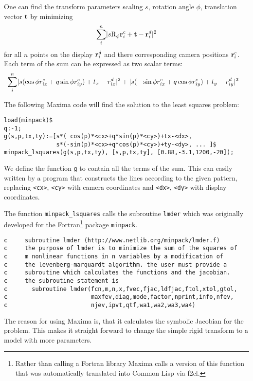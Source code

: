 One can find the transform parameters scaling $s$, rotation angle
$\phi$, translation vector $\mathbf{t}$ by minimizing
\begin{align}
  \sum_i^n \mathopen| s \textrm{R}_\phi \mathbf{r}^c_i+\mathbf{t} -\mathbf{r}^d_i \mathclose|^2 \label{eq:rigid-sum}
\end{align}
for all $n$ points on the display $\mathbf{r}^d_i$ and there corresponding
camera positions $\mathbf{r}^c_i$.  Each term of the sum can be expressed as
two scalar terms:
\begin{align*}
  \sum_i^n&
  \mathopen| s(\cos\phi r^c_{ix}+q\sin\phi r^c_{iy})+t_x-r^d_{ix} \mathclose|^2
  +
  \mathopen| s(-\sin\phi r^c_{ix}+q\cos\phi r^c_{iy})+t_y-r^d_{iy} \mathclose|^2
\end{align*}

The following Maxima code will find the solution to the least squares
problem:
\begin{verbatim}
load(minpack)$
q:-1;
g(s,p,tx,ty):=[s*( cos(p)*<cx>+q*sin(p)*<cy>)+tx-<dx>,
               s*(-sin(p)*<cx>+q*cos(p)*<cy>)+ty-<dy>, ... ]$
minpack_lsquares(g(s,p,tx,ty), [s,p,tx,ty], [0.88,-3.1,1200,-20]);
\end{verbatim}
We define the function \verb!g! to contain all the terms of the sum.
This can easily written by a program that constructs the lines
according to the given pattern, replacing \verb!<cx>!, \verb!<cy>!
with camera coordinates and \verb!<dx>!, \verb!<dy>! with display
coordinates.

The function \verb!minpack_lsquares! calls the subroutine \verb!lmder!
which was originally developed for the Fortran\footnote{Rather than
  calling a Fortran library Maxima calls a version of this function
  that was automatically translated into Common Lisp via {\sf f2cl}.}
package \verb!minpack!.

{\small
\begin{verbatim}
c     subroutine lmder (http://www.netlib.org/minpack/lmder.f)
c     the purpose of lmder is to minimize the sum of the squares of
c     m nonlinear functions in n variables by a modification of
c     the levenberg-marquardt algorithm. the user must provide a
c     subroutine which calculates the functions and the jacobian.
c     the subroutine statement is
c       subroutine lmder(fcn,m,n,x,fvec,fjac,ldfjac,ftol,xtol,gtol,
c                        maxfev,diag,mode,factor,nprint,info,nfev,
c                        njev,ipvt,qtf,wa1,wa2,wa3,wa4)
\end{verbatim}
}

\noindent The reason for using Maxima is, that it calculates the symbolic
Jacobian for the problem. This makes it straight forward to change the
simple rigid transform to a model with more parameters.

